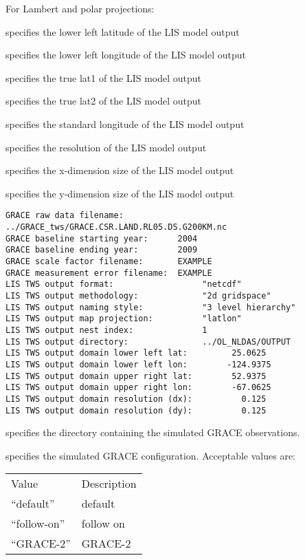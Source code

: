  For Lambert and polar projections:

 specifies the lower left latitude of the LIS model output

 specifies the lower left longitude of the LIS model output

 specifies the true lat1 of the LIS model output

 specifies the true lat2 of the LIS model output

 specifies the standard longitude of the LIS model output

 specifies the resolution of the LIS model output

 specifies the x-dimension size of the LIS model output

 specifies the y-dimension size of the LIS model output

 

 \begin{Verbatim}[frame=single]
GRACE raw data filename:    ../GRACE_tws/GRACE.CSR.LAND.RL05.DS.G200KM.nc
GRACE baseline starting year:      2004
GRACE baseline ending year:        2009
GRACE scale factor filename:       EXAMPLE
GRACE measurement error filename:  EXAMPLE
LIS TWS output format:                  "netcdf"
LIS TWS output methodology:             "2d gridspace"
LIS TWS output naming style:            "3 level hierarchy"
LIS TWS output map projection:          "latlon"
LIS TWS output nest index:              1
LIS TWS output directory:               ../OL_NLDAS/OUTPUT
LIS TWS output domain lower left lat:         25.0625
LIS TWS output domain lower left lon:        -124.9375
LIS TWS output domain upper right lat:        52.9375
LIS TWS output domain upper right lon:        -67.0625
LIS TWS output domain resolution (dx):          0.125
LIS TWS output domain resolution (dy):          0.125
 \end{Verbatim}

 
  specifies the directory
 containing the simulated GRACE observations.

  specifies the simulated GRACE
 configuration.
 Acceptable values are:

 \begin{tabular}{ll}
 Value         & Description \\
 ``default''   & default     \\
 ``follow-on'' & follow on   \\
 ``GRACE-2''   & GRACE-2     \\
 \end{tabular}


